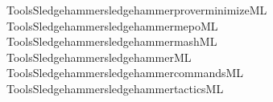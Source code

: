 \begin{isabellebody}
\ {\isacartoucheopen}Tools{\isacharslash}{\kern0pt}Sledgehammer{\isacharslash}{\kern0pt}sledgehammer{\isacharunderscore}{\kern0pt}prover{\isacharunderscore}{\kern0pt}minimize{\isachardot}{\kern0pt}ML{\isacartoucheclose}\isanewline
{}\isamarkupfalse%
\ {\isacartoucheopen}Tools{\isacharslash}{\kern0pt}Sledgehammer{\isacharslash}{\kern0pt}sledgehammer{\isacharunderscore}{\kern0pt}mepo{\isachardot}{\kern0pt}ML{\isacartoucheclose}\isanewline
{}\isamarkupfalse%
\ {\isacartoucheopen}Tools{\isacharslash}{\kern0pt}Sledgehammer{\isacharslash}{\kern0pt}sledgehammer{\isacharunderscore}{\kern0pt}mash{\isachardot}{\kern0pt}ML{\isacartoucheclose}\isanewline
{}\isamarkupfalse%
\ {\isacartoucheopen}Tools{\isacharslash}{\kern0pt}Sledgehammer{\isacharslash}{\kern0pt}sledgehammer{\isachardot}{\kern0pt}ML{\isacartoucheclose}\isanewline
{}\isamarkupfalse%
\ {\isacartoucheopen}Tools{\isacharslash}{\kern0pt}Sledgehammer{\isacharslash}{\kern0pt}sledgehammer{\isacharunderscore}{\kern0pt}commands{\isachardot}{\kern0pt}ML{\isacartoucheclose}\isanewline
{}\isamarkupfalse%
\ {\isacartoucheopen}Tools{\isacharslash}{\kern0pt}Sledgehammer{\isacharslash}{\kern0pt}sledgehammer{\isacharunderscore}{\kern0pt}tactics{\isachardot}{\kern0pt}ML{\isacartoucheclose}%
\endisatagML
{\isafoldML}%
%
\isadelimML
\isanewline
%
\endisadelimML
%
\isadelimtheory
\isanewline
%
\endisadelimtheory
%
\isatagtheory
{}\isamarkupfalse%
%
\endisatagtheory
{\isafoldtheory}%
%
\isadelimtheory
%
\endisadelimtheory
%
\end{isabellebody}%
\endinput
